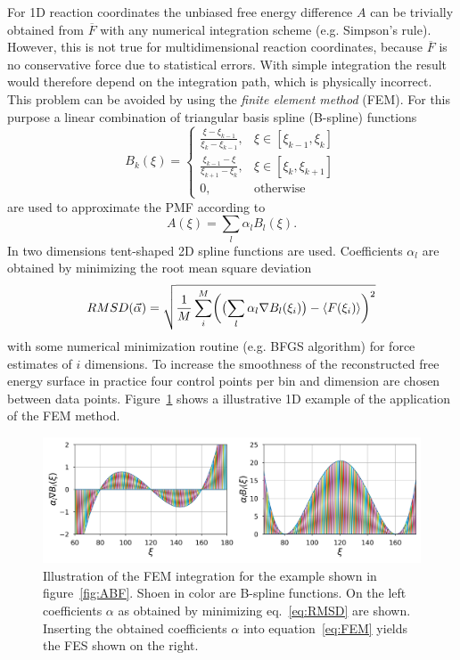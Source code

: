 For 1D reaction coordinates the unbiased free energy difference $A$ can be trivially obtained from $\overline{F}$ with any numerical integration scheme (e.g. Simpson's rule).
However, this is not true for multidimensional reaction coordinates, because $\overline{F}$ is no conservative force due to statistical errors. With simple integration the result would therefore depend on the integration path, which is physically incorrect. This problem can be avoided by using the \textit{finite element method} (FEM).\autocite{darve2008adaptive} For this purpose a linear combination of triangular basis spline (B-spline)\autocite{de1972calculating} functions
\begin{equation}
  B_k(\xi)=\left\{\begin{array}{ll} \frac{\xi-\xi_{k-1}}{\xi_k-\xi_{k-1}}, & \xi \in [\xi_{k-1},\xi_k] \\
                                    \frac{\xi_{k-1}-\xi}{\xi_{k+1}-\xi_{k}}, & \xi \in [\xi_{k},\xi_{k+1}] \\
                                    0, & \text{otherwise}
                  \end{array}\right.
  \label{eq:B spline}
\end{equation}
are used to approximate the PMF according to
\begin{equation}
  A(\xi) = \sum_l \alpha_l B_l(\xi). \label{eq:FEM}
\end{equation}
In two dimensions tent-shaped 2D spline functions are used.
Coefficients $\alpha_l$ are obtained by minimizing the root mean square deviation
\begin{equation}
  RMSD(\vec{\alpha})=\sqrt{\frac{1}{M}\sum_i^M\biggl(\bigl(\sum_l \alpha_l \nabla B_l(\xi_i)\bigr) - \braket{F(\xi_i)} \biggr)^2}
  \label{eq:RMSD}
\end{equation}
with some numerical minimization routine (e.g. BFGS algorithm\autocite{nocedal2006numerical}) for force estimates of $i$ dimensions. To increase the smoothness of the reconstructed free energy surface in practice four control points per bin and dimension are chosen between data points. Figure~\ref{fig:FEM} shows a illustrative 1D example of the application of the FEM method.
\begin{figure}[H]
    \centering
    \includegraphics[width=1\textwidth]{bilder/FEM_1D}
    \caption{
      Illustration of the FEM integration for the example shown in figure~\ref{fig:ABF}. Shoen in color are B-spline functions. On the left coefficients $\alpha$ as obtained by minimizing eq.~\ref{eq:RMSD} are shown. Inserting the obtained coefficients $\alpha$ into equation~\ref{eq:FEM} yields the FES shown on the right.
    }
\label{fig:FEM}%
\end{figure}
